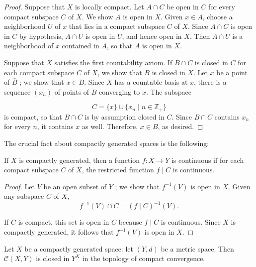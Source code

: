 \begin{proof}
Suppose that \(X\) is locally compact. Let \(A \cap C\) be open in \(C\) for every compact subspace \(C\) of \(X\). We show \(A\) is open in \(X\). Given \(x \in A\), choose a neighborhood \(U\) of \(x\) that lies in a compact subspace \(C\) of \(X\). Since \(A \cap C\) is open in \(C\) by hypothesis, \(A \cap U\) is open in \(U\), and hence open in \(X\). Then \(A \cap U\) is a neighborhood of \(x\) contained in \(A\), so that \(A\) is open in \(X\).

Suppose that \(X\) satisfies the first countability axiom. If \(B \cap C\) is closed in \(C\) for each compact subspace \(C\) of \(X\), we show that \(B\) is closed in \(X\). Let \(x\) be a point of \(\bar{B}\) ; we show that \(x \in B\). Since \(X\) has a countable basis at \(x\), there is a sequence \((x_{n})\) of points of \(B\) converging to \(x\). The subspace

\[
C = \{ x\} \cup \{ {x_{n} \mid n \in {\mathbb{Z}}_{ + }}\}
\]
is compact, so that \(B \cap C\) is by assumption closed in \(C\). Since \(B \cap C\) contains \(x_{n}\) for every \(n\), it contains \(x\) as well. Therefore, \(x \in B\), as desired.
\end{proof}

The crucial fact about compactly generated spaces is the following:

\begin{lemma}
\label{lem:\thetheorem}
If \(X\) is compactly generated, then a function \(f : X \rightarrow Y\) is continuous if for each compact subspace \(C\) of \(X\), the restricted function \(f \mid C\) is continuous.
\end{lemma}

\begin{proof}
Let \(V\) be an open subset of \(Y\) ; we show that \(f^{-1}( V)\) is open in \(X\). Given any subspace \(C\) of \(X\),
\[
f^{-1}( V) \cap C = {( f \mid C) }^{-1}( V).
\]

If \(C\) is compact, this set is open in \(C\) because \(f \mid C\) is continuous. Since \(X\) is compactly generated, it follows that \(f^{-1}( V)\) is open in \(X\).
\end{proof}
\begin{theorem}
\label{thm:\thetheorem}
Let \(X\) be a compactly generated space: let \((Y, d)\) be a metric space. Then \(\mathcal{C}({X,Y})\) is closed in \(Y^{X}\) in the topology of compact convergence.
\end{theorem}

